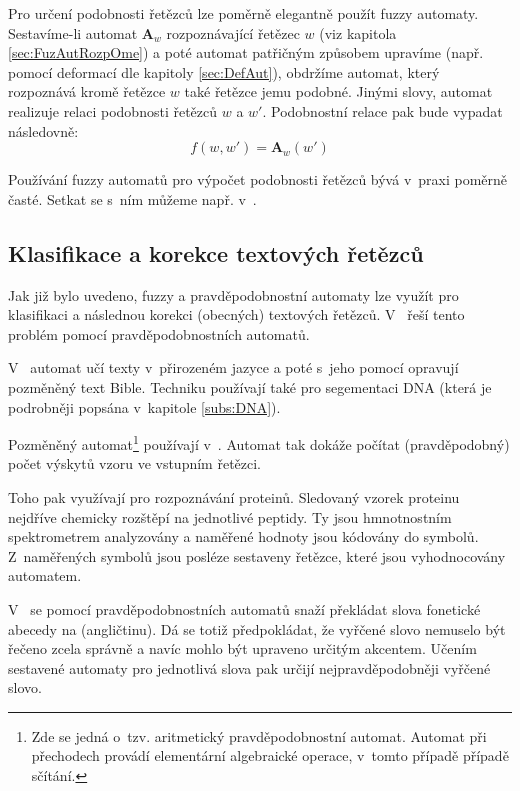 Pro určení podobnosti řetězců lze poměrně elegantně použít fuzzy automaty. Sestavíme-li automat $\mathbf{A}_w$ rozpoznávající řetězec $w$ (viz kapitola \ref{sec:FuzAutRozpOme}) a poté automat patřičným způsobem upravíme (např. pomocí deformací dle kapitoly \ref{sec:DefAut}), obdržíme automat, který rozpoznává kromě řetězce $w$ také řetězce jemu podobné. Jinými slovy, automat realizuje relaci podobnosti řetězců $w$ a $w'$. Podobnostní relace pak bude vypadat následovně:
$$
   f(w, w') = \mathbf{A}_w(w')
$$

Používání fuzzy automatů pro výpočet podobnosti řetězců bývá v~praxi poměrně časté. Setkat se s~ním můžeme např. v~\cite{AndAbdAsm-ApprPattMatcFuzzLog, Gar+-DefFuzAutCorImpStrFuzSym, Ast+-ImpStrMaExpUsDefFuzAut, RamGir-ConvFinAutFuzzAutStrComp, SetWar-FuzzAutPattMatc}.

\subsection{Klasifikace a korekce textových řetězců}
Jak již bylo uvedeno, fuzzy a pravděpodobnostní automaty lze využít pro klasifikaci a následnou korekci (obecných) textových řetězců. V~\cite{HigOnc-ComMosProStrProFiStaMa, Mar+-ProAriAutApp, Her-ProAriAutAppSoComFraBioSeqAna, YorSinTis-PowAmnLeaPrAuVarMemLen, Ron-AutLeaApp} řeší tento problém pomocí pravděpodobnostních automatů.

V~\cite{Ron-AutLeaApp} automat učí texty v~přirozeném jazyce a poté s~jeho pomocí opravují pozměněný text Bible. Techniku používají také pro segementaci DNA (která je podrobněji popsána v~kapitole \ref{subs:DNA}).

Pozměněný automat\footnote{Zde se jedná o~tzv. aritmetický pravděpodobnostní automat. Automat při přechodech provádí elementární algebraické operace, v~tomto případě případě sčítání.} používají v~\cite{Mar+-ProAriAutApp, Her-ProAriAutAppSoComFraBioSeqAna}. Automat tak dokáže počítat (pravděpodobný) počet výskytů vzoru ve vstupním řetězci.

Toho pak využívají pro rozpoznávání proteinů. Sledovaný vzorek proteinu nejdříve chemicky rozštěpí na jednotlivé peptidy. Ty jsou hmnotnostním spektrometrem analyzovány a naměřené hodnoty jsou kódovány do symbolů. Z~naměřených symbolů jsou posléze sestaveny řetězce, které jsou vyhodnocovány automatem.

V~\cite{MohPerRoe-WeiFinStaTraSpeRec, BahJel-DecChaWinDelSubApSpeRec} se pomocí pravděpodobnostních automatů snaží překládat slova fonetické abecedy na  (angličtinu). Dá se totiž předpokládat, že vyřčené slovo nemuselo být řečeno zcela správně a navíc mohlo být upraveno určitým akcentem. Učením sestavené automaty pro jednotlivá slova pak určijí nejpravděpodobněji vyřčené slovo.

